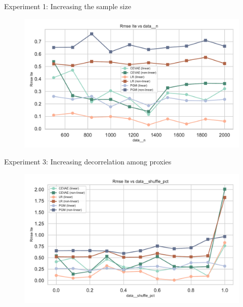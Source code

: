 \documentclass[10pt]{beamer}
\begin{document}
\begin{frame}{Experiment 1: Increasing the sample size}
  \begin{figure}[H]
      \includegraphics[width=\textwidth]{images/MyRun_data__n--rmse_ite.pdf}
    \end{figure}
\end{frame}

\begin{frame}{Experiment 3: Increasing decorrelation among proxies}
    \begin{figure}[H]
      \includegraphics[width=\textwidth]{images/MyRun_data__shuffle_pct--rmse_ite.pdf}
    \end{figure}

\end{frame}
\end{document}
